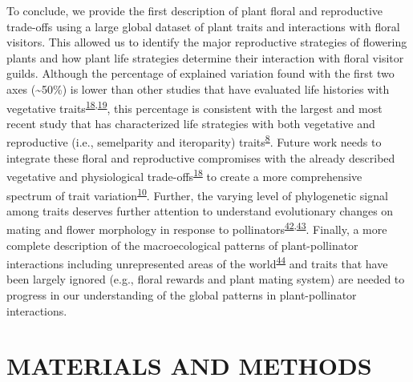 \documentclass[12pt,a4paper,]{article}
\begin{document}
To conclude, we provide the first description of plant floral and
reproductive trade-offs using a large global dataset of plant traits and
interactions with floral visitors. This allowed us to identify the major
reproductive strategies of flowering plants and how plant life
strategies determine their interaction with floral visitor guilds.
Although the percentage of explained variation found with the first two
axes (\textasciitilde{}50\%) is lower than other studies that have
evaluated life histories with vegetative
traits\textsuperscript{\protect\hyperlink{ref-diaz2016}{18},\protect\hyperlink{ref-carmona2021}{19}},
this percentage is consistent with the largest and most recent study
that has characterized life strategies with both vegetative and
reproductive (i.e., semelparity and iteroparity)
traits\textsuperscript{\protect\hyperlink{ref-salguero2016}{8}}. Future
work needs to integrate these floral and reproductive compromises with
the already described vegetative and physiological
trade-offs\textsuperscript{\protect\hyperlink{ref-diaz2016}{18}} to
create a more comprehensive spectrum of trait
variation\textsuperscript{\protect\hyperlink{ref-roddy2021}{10}}.
Further, the varying level of phylogenetic signal among traits deserves
further attention to understand evolutionary changes on mating and
flower morphology in response to
pollinators\textsuperscript{\protect\hyperlink{ref-gervasi2017}{42},\protect\hyperlink{ref-mackin2021}{43}}.
Finally, a more complete description of the macroecological patterns of
plant-pollinator interactions including unrepresented areas of the
world\textsuperscript{\protect\hyperlink{ref-poisot2021}{44}} and traits
that have been largely ignored (e.g., floral rewards and plant mating
system) are needed to progress in our understanding of the global
patterns in plant-pollinator interactions.

\section{MATERIALS AND METHODS}\label{materials-and-methods}
\end{document}
